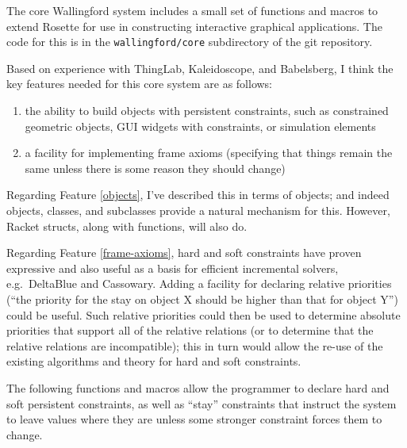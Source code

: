 \documentclass{article}
\begin{document}
The core Wallingford system includes a small set of functions and macros to
extend Rosette for use in constructing interactive graphical applications.
The code for this is in the \verb|wallingford/core| subdirectory of the git
repository.

Based on experience with ThingLab, Kaleidoscope, and Babelsberg, I think
the key features needed for this core system are as follows:

\begin{enumerate}
\item\label{objects} the ability to build objects with persistent
  constraints, such as constrained geometric objects, GUI widgets with
  constraints, or simulation elements

\item\label{frame-axioms} a facility for implementing frame axioms
  (specifying that things remain the same unless there is some reason
  they should change)
\end{enumerate}

Regarding Feature \ref{objects}, I've described this in terms of
objects; and indeed objects, classes, and subclasses provide a natural
mechanism for this.  However, Racket structs, along with functions,
will also do.

Regarding Feature \ref{frame-axioms}, hard and soft constraints
\cite{borning-lisp-symbolic-computation-1992} have proven expressive
and also useful as a basis for efficient incremental solvers,
e.g.\ DeltaBlue and Cassowary.  Adding a facility for declaring
relative priorities (``the priority for the stay on object X should be
higher than that for object Y'') could be useful.  Such relative
priorities could then be used to determine absolute priorities that
support all of the relative relations (or to determine that the
relative relations are incompatible); this in turn would allow the
re-use of the existing algorithms and theory for hard and soft
constraints.

The following functions and macros allow the programmer to declare
hard and soft persistent constraints, as well as ``stay'' constraints
that instruct the system to leave values where they are unless some
stronger constraint forces them to change.
\end{document}

